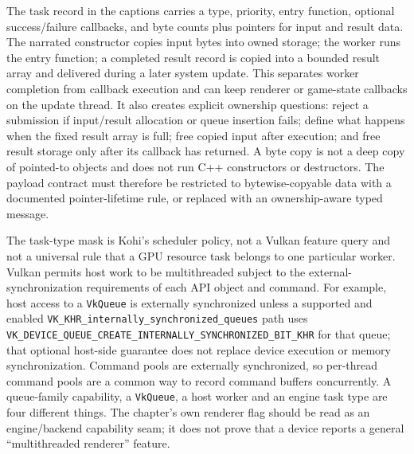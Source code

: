 The task record in the captions carries a type, priority, entry function, optional success/failure callbacks, and byte counts plus pointers for input and result data. The narrated constructor copies input bytes into owned storage; the worker runs the entry function; a completed result record is copied into a bounded result array and delivered during a later system update. This separates worker completion from callback execution and can keep renderer or game-state callbacks on the update thread. It also creates explicit ownership questions: reject a submission if input/result allocation or queue insertion fails; define what happens when the fixed result array is full; free copied input after execution; and free result storage only after its callback has returned. A byte copy is not a deep copy of pointed-to objects and does not run C++ constructors or destructors. The payload contract must therefore be restricted to bytewise-copyable data with a documented pointer-lifetime rule, or replaced with an ownership-aware typed message.

The task-type mask is Kohi's scheduler policy, not a Vulkan feature query and not a universal rule that a GPU resource task belongs to one particular worker. Vulkan permits host work to be multithreaded subject to the external-synchronization requirements of each API object and command. For example, host access to a \texttt{VkQueue} is externally synchronized unless a supported and enabled \texttt{VK\_KHR\_internally\_synchronized\_queues} path uses \texttt{VK\_DEVICE\_QUEUE\_CREATE\_INTERNALLY\_SYNCHRONIZED\_BIT\_KHR} for that queue; that optional host-side guarantee does not replace device execution or memory synchronization. Command pools are externally synchronized, so per-thread command pools are a common way to record command buffers concurrently. A queue-family capability, a \texttt{VkQueue}, a host worker and an engine task type are four different things. The chapter's own renderer flag should be read as an engine/backend capability seam; it does not prove that a device reports a general ``multithreaded renderer'' feature.

